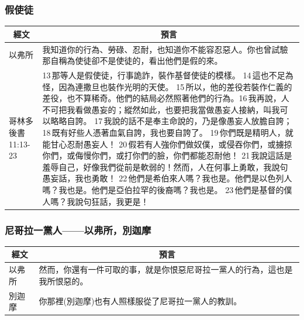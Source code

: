 \subsubsection{假使徒}
\begin{table}[H]
\centering
\begin{tabular}{p{}|p{}}\hline\hline
\multicolumn{1}{c|}{經文}&\multicolumn{1}{c}{預言}\\\hline
以弗所& 我知道你的行為、勞碌、忍耐，也知道你不能容忍惡人。你也曾試驗那自稱為使徒卻不是使徒的，看出他們是假的來。\\\hline  
 
哥林多後書11:13-23& 13 那等人是假使徒，行事詭詐，裝作基督使徒的模樣。 14 這也不足為怪，因為連撒旦也裝作光明的天使。 15 所以，他的差役若裝作仁義的差役，也不算稀奇。他們的結局必然照著他們的行為。16 我再說，人不可把我看做愚妄的；縱然如此，也要把我當做愚妄人接納，叫我可以略略自誇。 17 我說的話不是奉主命說的，乃是像愚妄人放膽自誇； 18 既有好些人憑著血氣自誇，我也要自誇了。 19 你們既是精明人，就能甘心忍耐愚妄人！ 20 假若有人強你們做奴僕，或侵吞你們，或擄掠你們，或侮慢你們，或打你們的臉，你們都能忍耐他！ 21 我說這話是羞辱自己，好像我們從前是軟弱的！然而，人在何事上勇敢，我說句愚妄話，我也勇敢！ 22 他們是希伯來人嗎？我也是。他們是以色列人嗎？我也是。他們是亞伯拉罕的後裔嗎？我也是。 23 他們是基督的僕人嗎？我說句狂話，我更是！\\\hline  
\end{tabular}
\end{table}
 
\subsubsection{尼哥拉一黨人——以弗所，別迦摩}
\begin{table}[H]
\centering
\begin{tabular}{p{}|p{}}\hline\hline
\multicolumn{1}{c|}{經文}&\multicolumn{1}{c}{預言}\\\hline 
以弗所&然而，你還有一件可取的事，就是你恨惡尼哥拉一黨人的行為，這也是我所恨惡的。\\\hline
別迦摩&你那裡(別迦摩)也有人照樣服從了尼哥拉一黨人的教訓。\\\hline  
\end{tabular} 
\end{table}
 
